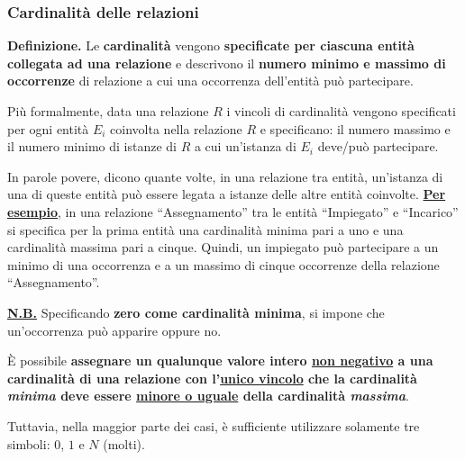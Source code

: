 \documentclass[a4paper]{article}
\newcommand{\dquotes}[1]{``#1''}
\begin{document}
	\subsubsection{Cardinalità delle relazioni}
	
	\textcolor{Red3}{\textbf{Definizione.}} Le \textbf{cardinalità} vengono \textbf{specificate per ciascuna entità collegata ad una relazione} e descrivono il \textbf{numero minimo e massimo di occorrenze} di relazione a cui una occorrenza dell'entità può partecipare.
	
	Più formalmente, data una relazione $R$ i vincoli di cardinalità vengono specificati per ogni entità $E_{i}$ coinvolta nella relazione $R$ e specificano: il numero massimo e il numero minimo di istanze di $R$ a cui un'istanza di $E_{i}$ deve/può partecipare.
	
	In parole povere, dicono quante volte, in una relazione tra entità, un'istanza di una di queste entità può essere legata a istanze delle altre entità coinvolte. \textbf{\underline{Per esempio}}, in una relazione \dquotes{Assegnamento} tra le entità \dquotes{Impiegato} e \dquotes{Incarico} si specifica per la prima entità una cardinalità minima pari a uno e una cardinalità massima pari a cinque. Quindi, un impiegato può partecipare a un minimo di una occorrenza e a un massimo di cinque occorrenze della relazione \dquotes{Assegnamento}.\newline
	
	\noindent
	\textbf{\underline{N.B.}} Specificando \textbf{zero come cardinalità minima}, si impone che un'occorrenza può apparire oppure no.\newline
	
	\noindent
	È possibile \textbf{assegnare un qualunque valore intero \underline{non negativo} a una cardinalità di una relazione con l'\underline{unico vincolo} che la cardinalità \emph{minima} deve essere \underline{minore o uguale} della cardinalità \emph{massima}}.
	
	\noindent
	Tuttavia, nella maggior parte dei casi, è sufficiente utilizzare solamente tre simboli: $0$, $1$ e $N$ (molti).
	
\end{document}
